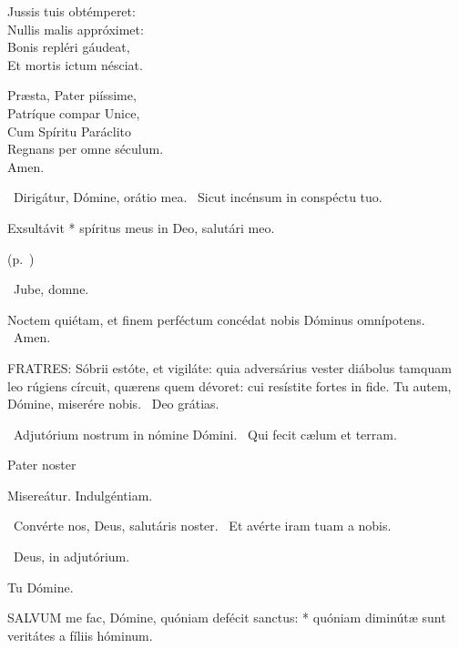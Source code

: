 Jussis tuis obtémperet:\\
Nullis malis appróximet:\\
Bonis repléri gáudeat,\\
Et mortis ictum nésciat.

Præsta, Pater piíssime,\\
Patríque compar Unice,\\
Cum Spíritu Paráclito\\
Regnans per omne séculum.\\
Amen.

\V\ Dirigátur, Dómine, orátio mea. \R\ Sicut incénsum in conspéctu tuo.


 Exsultávit * spíritus meus in Deo, salutári meo.

 (p.~\pageref{feria3:precesferialesvesperas})


\sectionornament


\V\ Jube, domne.

 Noctem quiétam, et finem perféctum concédat nobis Dóminus omnípotens. \R\ Amen.


\lettrine[lines=2]{F}{RATRES}: Sóbrii estóte, et vigiláte: quia adversárius vester diábolus tamquam leo rúgiens círcuit, quærens quem dévoret: cui resístite fortes in fide. Tu autem, Dómine, miserére nobis. \R\ Deo grátias.

\V\ Adjutórium nostrum in nómine Dómini. \R\ Qui fecit cælum et terram.

Pater noster 

 Misereátur. Indulgéntiam.

\V\ Convérte nos, Deus, salutáris noster. \R\ Et avérte iram tuam a nobis.

\V\ Deus, in adjutórium.

 Tu Dómine.


\lettrine[lines=2]{S}{ALVUM} me fac, Dómine, quóniam defécit sanctus: * quóniam diminútæ sunt veritátes a fíliis hóminum.

